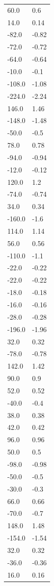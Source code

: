 \begin{longtable}{ll}
60.0 & 0.6 \\
14.0 & 0.14 \\
-82.0 & -0.82 \\
-72.0 & -0.72 \\
-64.0 & -0.64 \\
-10.0 & -0.1 \\
-108.0 & -1.08 \\
-224.0 & -2.24 \\
146.0 & 1.46 \\
-148.0 & -1.48 \\
-50.0 & -0.5 \\
78.0 & 0.78 \\
-94.0 & -0.94 \\
-12.0 & -0.12 \\
120.0 & 1.2 \\
-74.0 & -0.74 \\
34.0 & 0.34 \\
-160.0 & -1.6 \\
114.0 & 1.14 \\
56.0 & 0.56 \\
-110.0 & -1.1 \\
-22.0 & -0.22 \\
-22.0 & -0.22 \\
-18.0 & -0.18 \\
-16.0 & -0.16 \\
-28.0 & -0.28 \\
-196.0 & -1.96 \\
32.0 & 0.32 \\
-78.0 & -0.78 \\
142.0 & 1.42 \\
90.0 & 0.9 \\
52.0 & 0.52 \\
-40.0 & -0.4 \\
38.0 & 0.38 \\
42.0 & 0.42 \\
96.0 & 0.96 \\
50.0 & 0.5 \\
-98.0 & -0.98 \\
-50.0 & -0.5 \\
-30.0 & -0.3 \\
66.0 & 0.66 \\
-70.0 & -0.7 \\
148.0 & 1.48 \\
-154.0 & -1.54 \\
32.0 & 0.32 \\
-36.0 & -0.36 \\
16.0 & 0.16 \\

\end{longtable}
